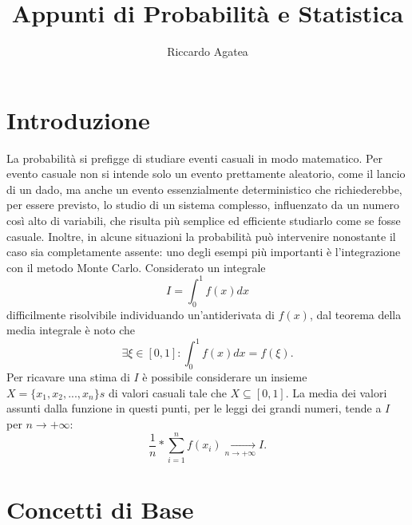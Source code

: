 \documentclass{article}
\title{Appunti di Probabilità e Statistica}
\author{Riccardo Agatea}
\theoremstyle{plain}
\theoremstyle{definition}
\theoremstyle{remark}
\begin{document}
\maketitle
\newpage
{}
\tableofcontents
\newpage
{}
\section{Introduzione} %
\label{sec:introduzione}
La probabilità si prefigge di studiare eventi casuali in modo matematico. Per evento casuale non si intende solo un evento prettamente aleatorio, come il lancio di un dado, ma anche un evento essenzialmente deterministico che richiederebbe, per essere previsto, lo studio di un sistema complesso, influenzato da un numero così alto di variabili, che risulta più semplice ed efficiente studiarlo come se fosse casuale. Inoltre, in alcune situazioni la probabilità può intervenire nonostante il caso sia completamente assente: uno degli esempi più importanti è l'integrazione con il metodo Monte Carlo. Considerato un integrale
\begin{equation*}
	I=\int_0^1 f(x)dx
\end{equation*}
difficilmente risolvibile individuando un'antiderivata di $f(x)$, dal teorema della media integrale è noto che
\begin{equation*}
	\exists\xi\in [0,1]\colon\int_0^1 f(x)dx=f(\xi)\text{.}
\end{equation*}
Per ricavare una stima di $I$ è possibile considerare un insieme $X=\{x_1,x_2,...,x_n\}s$ di valori casuali tale che $X\subseteq [0,1]$. La media dei valori assunti dalla funzione in questi punti, per le leggi dei grandi numeri, tende a $I$ per $n\to+\infty$:
\begin{equation*}
	\frac{1}{n}*\sum_{i=1}^{n}f(x_i)\xrightarrow[n\to+\infty]{}I\text{.}
\end{equation*}
\section{Concetti di Base} %
\label{sec:concetti_di_base}
\end{document}
